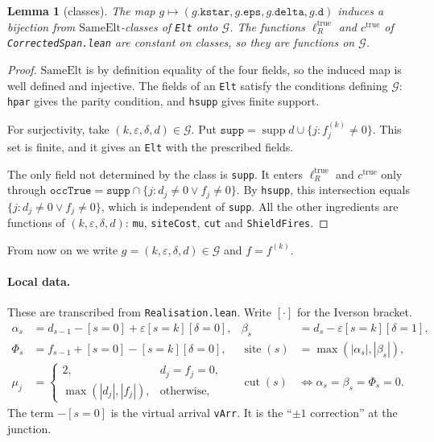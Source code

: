 \documentclass[11pt]{article}
\theoremstyle{plain}
\newtheorem{lemma}[theorem]{Lemma}
\theoremstyle{definition}
\theoremstyle{remark}
\begin{document}
\begin{lemma}[classes]\label{M3:lem:classes}
The map $g\mapsto(g.\mathtt{kstar},g.\mathtt{eps},g.\mathtt{delta},g.\mathtt d)$ induces a
bijection from $\mathrm{SameElt}$-classes of \texttt{Elt} onto $\mathcal G$. The functions
$\ell_R^{\mathrm{true}}$ and $c^{\mathrm{true}}$ of \texttt{CorrectedSpan.lean} are
constant on classes, so they are functions on $\mathcal G$.
\end{lemma}

\begin{proof}
$\mathrm{SameElt}$ is by definition equality of the four fields, so the induced map is well
defined and injective. The fields of an \texttt{Elt} satisfy the conditions defining
$\mathcal G$: \texttt{hpar} gives the parity condition, and \texttt{hsupp} gives finite support.

For surjectivity, take $(k,\varepsilon,\delta,d)\in\mathcal G$. Put
$\mathtt{supp}=\operatorname{supp}d\cup\{j:f^{(k)}_j\ne0\}$. This set is finite, and it gives an
\texttt{Elt} with the prescribed fields.

The only field not determined by the class is \texttt{supp}. It enters
$\ell_R^{\mathrm{true}}$ and $c^{\mathrm{true}}$ only through
$\mathtt{occTrue}=\mathtt{supp}\cap\{j:d_j\ne0\vee f_j\ne0\}$. By \texttt{hsupp}, this
intersection equals $\{j:d_j\ne0\vee f_j\ne0\}$, which is independent of \texttt{supp}. All
the other ingredients are functions of $(k,\varepsilon,\delta,d)$:
\texttt{mu}, \texttt{siteCost}, \texttt{cut} and \texttt{ShieldFires}.
\end{proof}

From now on we write $g=(k,\varepsilon,\delta,d)\in\mathcal G$ and $f=f^{(k)}$.

\paragraph{Local data.}
These are transcribed from \texttt{Realisation.lean}. Write $[\cdot]$ for the Iverson bracket.
\begin{align*}
  \alpha_s&=d_{s-1}-[s=0]+\varepsilon[s=k][\delta=0],&
  \beta_s&=d_s-\varepsilon[s=k][\delta=1],\\
  \Phi_s&=f_{s-1}+[s=0]-[s=k][\delta=0],&
  \operatorname{site}(s)&=\max(|\alpha_s|,|\beta_s|),\\
  \mu_j&=\begin{cases}2,&d_j=f_j=0,\\ \max(|d_j|,|f_j|),&\text{otherwise,}\end{cases}&
  \operatorname{cut}(s)&\iff\alpha_s=\beta_s=\Phi_s=0 .
\end{align*}
The term $-[s=0]$ is the virtual arrival \texttt{vArr}. It is the ``$\pm1$ correction'' at
the junction.
\end{document}
